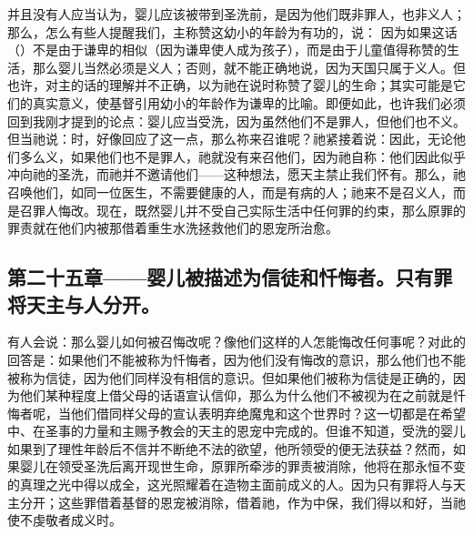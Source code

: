 并且没有人应当认为，婴儿应该被带到圣洗前，是因为他们既非罪人，也非义人；那么，怎么有些人提醒我们，主称赞这幼小的年龄为有功的，说： 因为如果这话（）不是由于谦卑的相似（因为谦卑使人成为孩子），而是由于儿童值得称赞的生活，那么婴儿当然必须是义人；否则，就不能正确地说，因为天国只属于义人。但也许，对主的话的理解并不正确，以为祂在说时称赞了婴儿的生命；其实可能是它们的真实意义，使基督引用幼小的年龄作为谦卑的比喻。即便如此，也许我们必须回到我刚才提到的论点：婴儿应当受洗，因为虽然他们不是罪人，但他们也不义。但当祂说：时，好像回应了这一点，那么祢来召谁呢？祂紧接着说：因此，无论他们多么义，如果他们也不是罪人，祂就没有来召他们，因为祂自称：他们因此似乎冲向祂的圣洗，而祂并不邀请他们——这种想法，愿天主禁止我们怀有。那么，祂召唤他们，如同一位医生，不需要健康的人，而是有病的人；祂来不是召义人，而是召罪人悔改。现在，既然婴儿并不受自己实际生活中任何罪的约束，那么原罪的罪责就在他们内被那借着重生水洗拯救他们的恩宠所治愈。\par


\subsection{第二十五章——婴儿被描述为信徒和忏悔者。只有罪将天主与人分开。}

有人会说：那么婴儿如何被召悔改呢？像他们这样的人怎能悔改任何事呢？对此的回答是：如果他们不能被称为忏悔者，因为他们没有悔改的意识，那么他们也不能被称为信徒，因为他们同样没有相信的意识。但如果他们被称为信徒是正确的，因为他们某种程度上借父母的话语宣认信仰，那么为什么他们不被视为在之前就是忏悔者呢，当他们借同样父母的宣认表明弃绝魔鬼和这个世界时？这一切都是在希望中、在圣事的力量和主赐予教会的天主的恩宠中完成的。但谁不知道，受洗的婴儿如果到了理性年龄后不信并不断绝不法的欲望，他所领受的便无法获益？然而，如果婴儿在领受圣洗后离开现世生命，原罪所牵涉的罪责被消除，他将在那永恒不变的真理之光中得以成全，这光照耀着在造物主面前成义的人。因为只有罪将人与天主分开；这些罪借着基督的恩宠被消除，借着祂，作为中保，我们得以和好，当祂使不虔敬者成义时。\par



